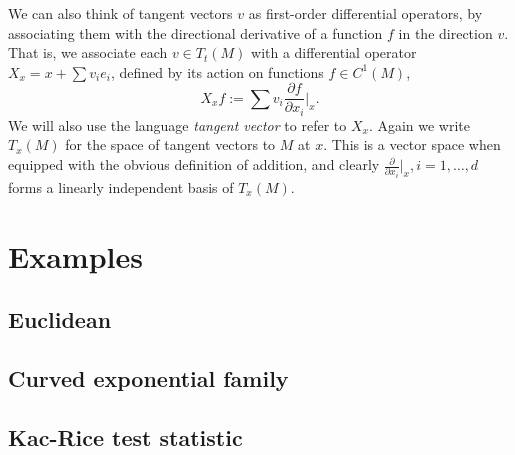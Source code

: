 \documentclass{article}
\begin{document}
	We can also think of tangent vectors $v$ as first-order differential operators, by associating them with the directional derivative of a function $f$ in the direction $v$. That is, we associate each $v \in T_t(M)$ with a differential operator $X_x = x + \sum v_i e_i$, defined by its action on functions $f \in C^1(M)$,
	\begin{equation*}
		X_xf := \sum v_i \frac{\partial f}{\partial x_i} \Big|_{x}.
	\end{equation*}
	We will also use the language \emph{tangent vector} to refer to $X_x$. Again we write $T_x(M)$ for the space of tangent vectors to $M$ at $x$. This is a vector space when equipped with the obvious definition of addition, and clearly $\frac{\partial}{\partial x_i}|_x, i = 1,\ldots,d$ forms a linearly independent basis of $T_x(M)$. 
	
	\section{Examples}
	
	\subsection{Euclidean}
	
	\subsection{Curved exponential family}
	
	\subsection{Kac-Rice test statistic}
	
\end{document}
